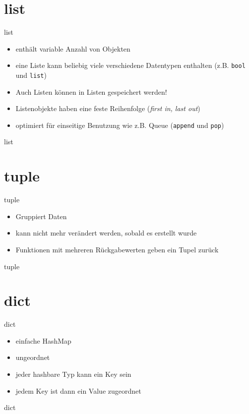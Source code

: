 \section{list}
\begin{frame}{list}

\begin{itemize}
	\item enth\"alt variable Anzahl von Objekten
	\item eine Liste kann beliebig viele verschiedene Datentypen enthalten (z.B. \texttt{bool} und \texttt{list})
	\item Auch Listen k\"onnen in Listen gespeichert werden!
	\item Listenobjekte haben eine feste Reihenfolge (\textit{first in, last out})
	\item optimiert f\"ur einseitige Benutzung wie z.B. Queue (\texttt{append} und \texttt{pop})
\end{itemize}
\end{frame}
\begin{frame}{list}
	
\end{frame}

\section{tuple}
\begin{frame}{tuple}
\begin{itemize}
	\item Gruppiert Daten
	\item kann nicht mehr ver\"andert werden, sobald es erstellt wurde
	\item Funktionen mit mehreren R\"uckgabewerten geben ein Tupel zur\"uck
\end{itemize}
\end{frame}
\begin{frame}{tuple}
	
\end{frame}


\section{dict}
\begin{frame}{dict}
\begin{itemize}
	\item einfache HashMap
	\item ungeordnet
	\item jeder hashbare Typ kann ein Key sein
	\item jedem Key ist dann ein Value zugeordnet
\end{itemize}
\end{frame}
\begin{frame}{dict}

\end{frame}

